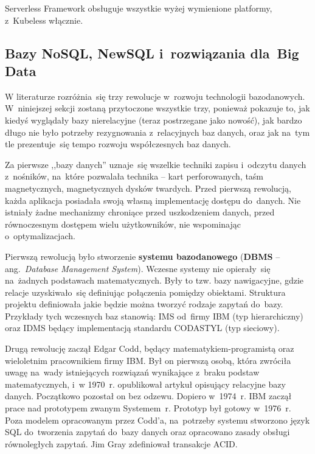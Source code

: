 \documentclass[12pt,a4paper,twoside,titlepage,openright]{book}
\begin{document}
Serverless Framework obsługuje wszystkie wyżej wymienione platformy, z~Kubeless włącznie.\cite{siteServerlessFramework}


\subsection{Bazy NoSQL, NewSQL i~rozwiązania dla~Big Data} \label{section:nosql}

W literaturze rozróżnia~się trzy rewolucje w~rozwoju technologii bazodanowych.  \cite{noSqlHistory} W~niniejszej sekcji zostaną przytoczone wszystkie trzy, ponieważ pokazuje to, jak kiedyś wyglądały bazy nierelacyjne (teraz postrzegane jako nowość), jak bardzo długo nie było potrzeby rezygnowania z~relacyjnych baz danych, oraz jak na~tym tle prezentuje~się tempo rozwoju współczesnych baz danych.

Za pierwsze ,,bazy danych'' uznaje~się wszelkie techniki zapisu i~odczytu danych z~nośników, na~które pozwalała technika -- kart perforowanych, taśm magnetycznych, magnetycznych dysków twardych. Przed pierwszą rewolucją, każda aplikacja posiadała swoją własną implementację dostępu do~danych. Nie istniały żadne mechanizmy chroniące przed uszkodzeniem danych, przed równoczesnym dostępem wielu użytkowników, nie wspominając o~optymalizacjach. 

Pierwszą rewolucją było stworzenie \textbf{systemu bazodanowego} (\textbf{DBMS} -- ang.~\textit{Database Management System}). Wczesne systemy nie opierały~się na~żadnych podstawach matematycznych. Były to tzw. bazy nawigacyjne, gdzie relacje uzyskiwało~się definiując połączenia pomiędzy obiektami. Struktura projektu definiowała jakie będzie można tworzyć rodzaje zapytań do~bazy. Przykłady tych wczesnych baz stanowią: IMS od~firmy IBM (typ hierarchiczny) oraz IDMS będący implementacją standardu CODASTYL (typ sieciowy). 

Drugą rewolucję zaczął Edgar Codd, będący matematykiem-programistą oraz wieloletnim pracownikiem firmy IBM. Był on pierwszą osobą, która zwróciła uwagę na~wady istniejących rozwiązań wynikające z~braku podstaw matematycznych, i~w 1970~r. opublikował artykuł opisujący relacyjne bazy danych. Początkowo pozostał on bez odzewu. Dopiero w~1974~r. IBM zaczął prace nad prototypem zwanym Systemem~r. Prototyp był gotowy w~1976~r. Poza modelem opracowanym przez Codd'a, na~potrzeby systemu stworzono język SQL do~tworzenia zapytań do~bazy danych oraz opracowano zasady obsługi równoległych zapytań. Jim Gray zdefiniował transakcje ACID.
\end{document}
